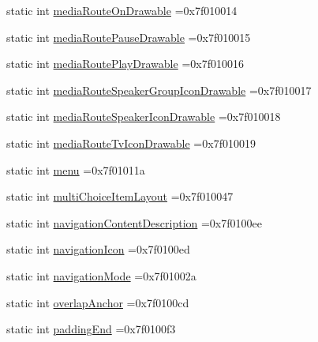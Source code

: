 \begin{DoxyCompactItemize}
\item 
static int \hyperlink{classandroid_1_1support_1_1v7_1_1appcompat_1_1R_1_1attr_a02adfff341757bb08f81109b14ee25a0}{media\+Route\+On\+Drawable} =0x7f010014
\item 
static int \hyperlink{classandroid_1_1support_1_1v7_1_1appcompat_1_1R_1_1attr_a7204d16c44f7535d8d1fcce7aad07229}{media\+Route\+Pause\+Drawable} =0x7f010015
\item 
static int \hyperlink{classandroid_1_1support_1_1v7_1_1appcompat_1_1R_1_1attr_acfa4ada8714bdd2f4ad0cc6100b82fd1}{media\+Route\+Play\+Drawable} =0x7f010016
\item 
static int \hyperlink{classandroid_1_1support_1_1v7_1_1appcompat_1_1R_1_1attr_a76d7150cd6f8ee9ee61ff719b36364cc}{media\+Route\+Speaker\+Group\+Icon\+Drawable} =0x7f010017
\item 
static int \hyperlink{classandroid_1_1support_1_1v7_1_1appcompat_1_1R_1_1attr_ab7f7a816aed59b138fe4663c5d097d38}{media\+Route\+Speaker\+Icon\+Drawable} =0x7f010018
\item 
static int \hyperlink{classandroid_1_1support_1_1v7_1_1appcompat_1_1R_1_1attr_a0221ccb0a2c02fa6f266419c891e5dc0}{media\+Route\+Tv\+Icon\+Drawable} =0x7f010019
\item 
static int \hyperlink{classandroid_1_1support_1_1v7_1_1appcompat_1_1R_1_1attr_ad3871796a0d29974680c8d438612fa54}{menu} =0x7f01011a
\item 
static int \hyperlink{classandroid_1_1support_1_1v7_1_1appcompat_1_1R_1_1attr_a5478cc4fbc24577eb3dc9e7466d6e426}{multi\+Choice\+Item\+Layout} =0x7f010047
\item 
static int \hyperlink{classandroid_1_1support_1_1v7_1_1appcompat_1_1R_1_1attr_adbceba5aef503142f0cb67ecf32c3500}{navigation\+Content\+Description} =0x7f0100ee
\item 
static int \hyperlink{classandroid_1_1support_1_1v7_1_1appcompat_1_1R_1_1attr_a1f9dac21fa90b5d11e9f0e54b22a47ec}{navigation\+Icon} =0x7f0100ed
\item 
static int \hyperlink{classandroid_1_1support_1_1v7_1_1appcompat_1_1R_1_1attr_a15549c3d8819d1bbfe5aab0c51cb2b65}{navigation\+Mode} =0x7f01002a
\item 
static int \hyperlink{classandroid_1_1support_1_1v7_1_1appcompat_1_1R_1_1attr_ad62e549e49cbd9c72df304e753d22158}{overlap\+Anchor} =0x7f0100cd
\item 
static int \hyperlink{classandroid_1_1support_1_1v7_1_1appcompat_1_1R_1_1attr_a53f8fb182350de961ffa4ba1b786cb3a}{padding\+End} =0x7f0100f3
\item 

\end{DoxyCompactItemize}
